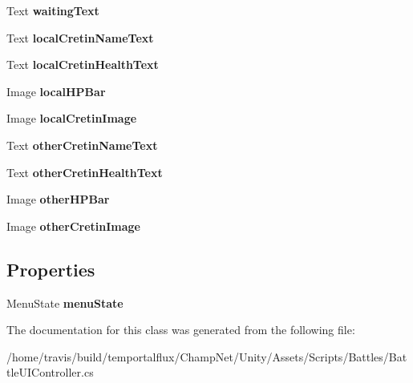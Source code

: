 \begin{DoxyCompactItemize}
\item 
\hypertarget{group__client_ga2f5cb0c646d3675c7c7805381d7e54d2}{Text {\bfseries waiting\-Text}}\label{group__client_ga2f5cb0c646d3675c7c7805381d7e54d2}

\item 
\hypertarget{group__client_ga72b6e8ee777e63e4cbcf7a51cede53ed}{Text {\bfseries local\-Cretin\-Name\-Text}}\label{group__client_ga72b6e8ee777e63e4cbcf7a51cede53ed}

\item 
\hypertarget{group__client_ga77e347d67633680a65e9adf1f790176a}{Text {\bfseries local\-Cretin\-Health\-Text}}\label{group__client_ga77e347d67633680a65e9adf1f790176a}

\item 
\hypertarget{group__client_ga2b64cecb96ddcc2f7dfdeb062ed1869e}{Image {\bfseries local\-H\-P\-Bar}}\label{group__client_ga2b64cecb96ddcc2f7dfdeb062ed1869e}

\item 
\hypertarget{group__client_ga439b1d52e7ba7833ecac8b5af098ce53}{Image {\bfseries local\-Cretin\-Image}}\label{group__client_ga439b1d52e7ba7833ecac8b5af098ce53}

\item 
\hypertarget{group__client_gad58b390bc1a3e5cf185cbee5d300dcef}{Text {\bfseries other\-Cretin\-Name\-Text}}\label{group__client_gad58b390bc1a3e5cf185cbee5d300dcef}

\item 
\hypertarget{group__client_gad9604d7804d5c5c0bb227bf3b67fc2d4}{Text {\bfseries other\-Cretin\-Health\-Text}}\label{group__client_gad9604d7804d5c5c0bb227bf3b67fc2d4}

\item 
\hypertarget{group__client_gab3cc33d5aeca7b5fca82f8de11ac072e}{Image {\bfseries other\-H\-P\-Bar}}\label{group__client_gab3cc33d5aeca7b5fca82f8de11ac072e}

\item 
\hypertarget{group__client_ga9f4c72551b5bcd3a3718802c49af0267}{Image {\bfseries other\-Cretin\-Image}}\label{group__client_ga9f4c72551b5bcd3a3718802c49af0267}

\end{DoxyCompactItemize}
\subsection*{Properties}
\begin{DoxyCompactItemize}
\item 
\hypertarget{group__client_ga4f8584c7f4ebdeb9b29bf982dc8a5e5d}{Menu\-State {\bfseries menu\-State}}\label{group__client_ga4f8584c7f4ebdeb9b29bf982dc8a5e5d}

\end{DoxyCompactItemize}


The documentation for this class was generated from the following file\-:\begin{DoxyCompactItemize}
\item 
/home/travis/build/temportalflux/\-Champ\-Net/\-Unity/\-Assets/\-Scripts/\-Battles/Battle\-U\-I\-Controller.\-cs\end{DoxyCompactItemize}

